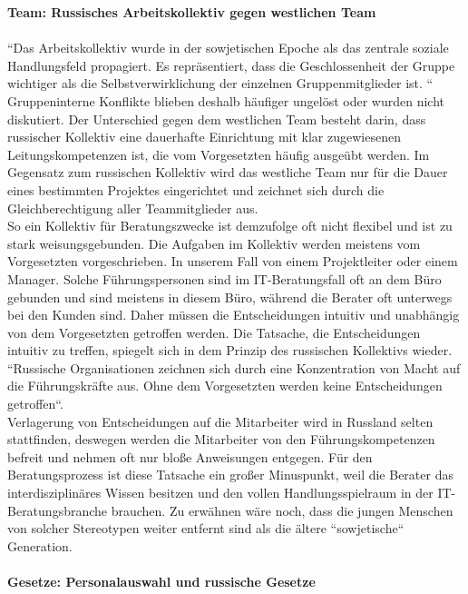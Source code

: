 	\textbf{Team: %
	Russisches Arbeitskollektiv gegen westlichen Team}\\
	\\
	``Das Arbeitskollektiv wurde in der sowjetischen 
	Epoche als das zentrale soziale Handlungsfeld propagiert. Es repräsentiert, dass die Geschlossenheit der Gruppe wichtiger als die Selbstverwirklichung der einzelnen Gruppenmitglieder ist. `` \cite{ProzessbeglBerRU}\\
	Gruppeninterne Konflikte blieben deshalb häufiger ungelöst oder wurden nicht diskutiert. Der Unterschied gegen dem westlichen Team besteht darin, dass russischer Kollektiv eine dauerhafte Einrichtung mit klar zugewiesenen Leitungskompetenzen ist, die vom Vorgesetzten häufig ausgeübt werden. Im Gegensatz zum russischen Kollektiv wird das westliche Team nur für die Dauer eines bestimmten Projektes eingerichtet und zeichnet sich durch die Gleichberechtigung aller Teammitglieder aus.\\
	So ein Kollektiv für Beratungszwecke ist demzufolge oft nicht flexibel und ist zu stark weisungsgebunden. Die Aufgaben im Kollektiv werden meistens vom Vorgesetzten vorgeschrieben. In unserem Fall von einem Projektleiter oder einem Manager. Solche Führungspersonen sind im IT-Beratungsfall oft an dem Büro gebunden und sind meistens in diesem Büro, während die Berater oft unterwegs bei den Kunden sind. Daher müssen die Entscheidungen intuitiv und unabhängig von dem Vorgesetzten getroffen werden. Die Tatsache, die Entscheidungen intuitiv zu treffen, spiegelt sich in dem Prinzip des russischen Kollektivs wieder.  ``Russische Organisationen zeichnen sich durch eine Konzentration von Macht auf die Führungskräfte aus. Ohne dem Vorgesetzten werden keine Entscheidungen getroffen``. \cite{ProzessbeglBerRU} \\
	Verlagerung von Entscheidungen auf die Mitarbeiter wird in Russland selten stattfinden, deswegen werden die Mitarbeiter von den Führungskompetenzen befreit und nehmen oft nur bloße Anweisungen entgegen. Für  den Beratungsprozess ist diese Tatsache ein großer Minuspunkt, weil die Berater das interdisziplinäres Wissen besitzen und  den vollen Handlungsspielraum in der IT-Beratungsbranche brauchen.
	Zu erwähnen wäre noch, dass die jungen Menschen von solcher Stereotypen weiter entfernt sind als die ältere ``sowjetische`` Generation. \\ \\
	\textbf{Gesetze: Personalauswahl und russische Gesetze}\\
	\\
